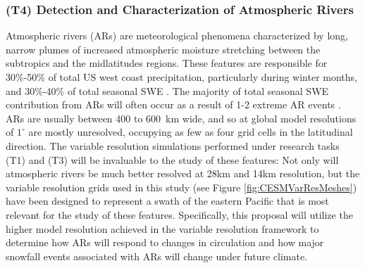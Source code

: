 \documentclass[11pt]{article}
\begin{document}

\subsubsection{(T4) Detection and Characterization of Atmospheric Rivers}

Atmospheric rivers (ARs) are meteorological phenomena characterized by long, narrow plumes of increased atmospheric moisture stretching between the subtropics and the midlatitudes regions.  These features are responsible for 30\%-50\% of total US west coast precipitation, particularly during winter months, and 30\%-40\% of total seasonal SWE \citep{dettinger2011atmospheric}.  The majority of total seasonal SWE contribution from ARs will often occur as a result of 1-2 extreme AR events \citep{guan2010extreme}.  ARs are usually between 400 to 600\ km wide, and so at global model resolutions of $1^\circ$ are mostly unresolved, occupying as few as four grid cells in the latitudinal direction.  The variable resolution simulations performed under research tasks (T1) and (T3) will be invaluable to the study of these features: Not only will atmospheric rivers be much better resolved at 28km and 14km resolution, but the variable resolution grids used in this study (see Figure \ref{fig:CESMVarResMeshes}) have been designed to represent a swath of the eastern Pacific that is most relevant for the study of these features.  Specifically, this proposal will utilize the higher model resolution achieved in the variable resolution framework to determine how ARs will respond to changes in circulation and how major snowfall events associated with ARs will change under future climate.
\end{document}
